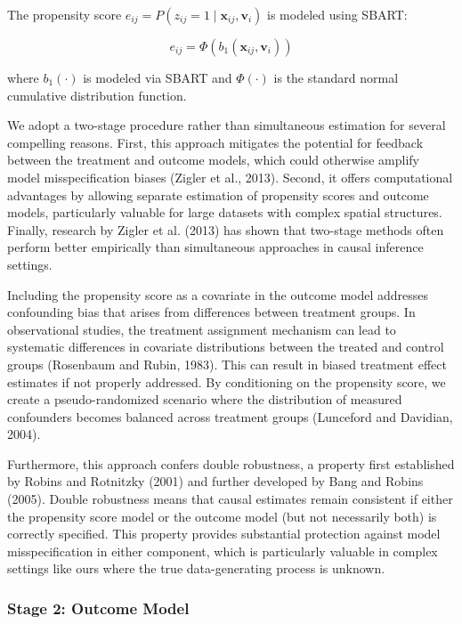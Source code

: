 \documentclass[useAMS,referee]{biom}
\begin{document}
The propensity score $e_{ij} = P(z_{ij}=1 \mid \mathbf{x}_{ij}, \mathbf{v}_i)$ is modeled using SBART:

\begin{equation}
e_{ij} = \Phi(b_1(\mathbf{x}_{ij}, \mathbf{v}_i))
\end{equation}

where $b_1(\cdot)$ is modeled via SBART and $\Phi(\cdot)$ is the standard normal cumulative distribution function.

We adopt a two-stage procedure rather than simultaneous estimation for several compelling reasons. First, this approach mitigates the potential for feedback between the treatment and outcome models, which could otherwise amplify model misspecification biases (Zigler et al., 2013). Second, it offers computational advantages by allowing separate estimation of propensity scores and outcome models, particularly valuable for large datasets with complex spatial structures. Finally, research by Zigler et al. (2013) has shown that two-stage methods often perform better empirically than simultaneous approaches in causal inference settings.

Including the propensity score as a covariate in the outcome model addresses confounding bias that arises from differences between treatment groups. In observational studies, the treatment assignment mechanism can lead to systematic differences in covariate distributions between the treated and control groups (Rosenbaum and Rubin, 1983). This can result in biased treatment effect estimates if not properly addressed. By conditioning on the propensity score, we create a pseudo-randomized scenario where the distribution of measured confounders becomes balanced across treatment groups (Lunceford and Davidian, 2004). 

Furthermore, this approach confers double robustness, a property first established by Robins and Rotnitzky (2001) and further developed by Bang and Robins (2005). Double robustness means that causal estimates remain consistent if either the propensity score model or the outcome model (but not necessarily both) is correctly specified. This property provides substantial protection against model misspecification in either component, which is particularly valuable in complex settings like ours where the true data-generating process is unknown.

\subsubsection{Stage 2: Outcome Model}
\end{document}
